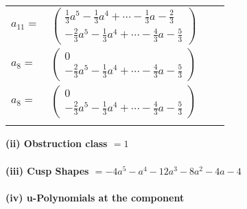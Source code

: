 \documentclass[1p]{elsarticle_modified}
\theoremstyle{definition}
\begin{document}
\begin{tabular}{m{7pt} m{180pt} m{7pt} m{180pt} }
\flushright $a_{11}=$&$\begin{pmatrix}\frac{1}{3} a^5-\frac{1}{3} a^4+\cdots-\frac{1}{3} a-\frac{2}{3}\\-\frac{2}{3} a^5-\frac{1}{3} a^4+\cdots-\frac{4}{3} a-\frac{5}{3}\end{pmatrix}$ \\
\flushright $a_{8}=$&$\begin{pmatrix}0\\-\frac{2}{3} a^5-\frac{1}{3} a^4+\cdots-\frac{4}{3} a-\frac{5}{3}\end{pmatrix}$\\ \flushright $a_{8}=$&$\begin{pmatrix}0\\-\frac{2}{3} a^5-\frac{1}{3} a^4+\cdots-\frac{4}{3} a-\frac{5}{3}\end{pmatrix}$\\&\end{tabular}
\flushleft \textbf{(ii) Obstruction class $= 1$}\\~\\
\flushleft \textbf{(iii) Cusp Shapes $= -4 a^5- a^4-12 a^3-8 a^2-4 a-4$}\\~\\
\newpage\renewcommand{\arraystretch}{1}
\flushleft \textbf{(iv) u-Polynomials at the component}\newline \\
\end{document}
